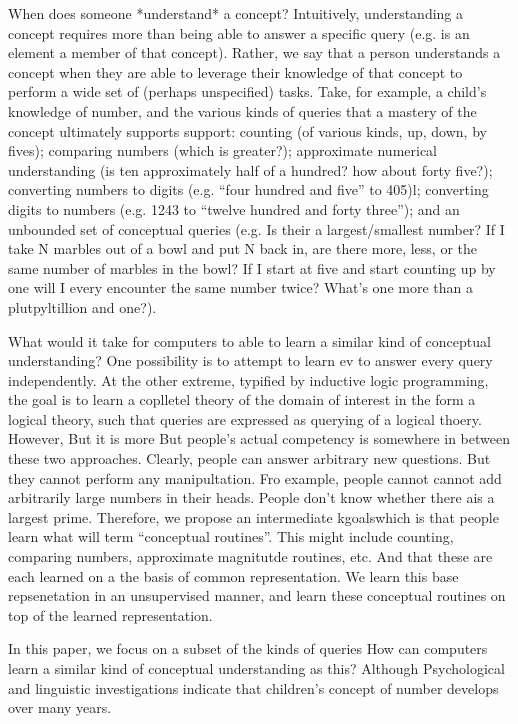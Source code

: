 \documentclass{article}
\begin{document}
When does someone *understand* a concept? Intuitively, understanding a
concept requires more than being able to answer a specific query
(e.g. is an element a member of that concept). Rather, we say that a
person understands a concept when they are able to leverage their
knowledge of that concept to perform a wide set of (perhaps
unspecified) tasks. Take, for example, a child's knowledge of number,
and the various kinds of queries that a mastery of the concept
ultimately supports support: counting (of various kinds, up, down, by
fives); comparing numbers (which is greater?); approximate numerical
understanding (is ten approximately half of a hundred? how about forty
five?); converting numbers to digits (e.g. ``four hundred and five''
to 405)l; converting digits to numbers (e.g. 1243 to ``twelve hundred
and forty three''); and an unbounded set of conceptual queries
(e.g. Is their a largest/smallest number? If I take N marbles out of a
bowl and put N back in, are there more, less, or the same number of
marbles in the bowl? If I start at five and start counting up by one
will I every encounter the same number twice? What's one more than a
plutpyltillion and one?).

What would it take for computers to able to learn a similar kind of
conceptual understanding? One possibility is to attempt to learn ev to
answer every query independently. At the other extreme, typified by
inductive logic programming, the goal is to learn a coplletel theory
of the domain of interest in the form a logical theory, such that
queries are expressed as querying of a logical thoery. However, But it
is more But people's actual competency is somewhere in between these
two approaches.  Clearly, people can answer arbitrary new
questions. But they cannot perform any manipultation. Fro example,
people cannot cannot add arbitrarily large numbers in their
heads. People don't know whether there ais a largest prime.
Therefore, we propose an intermediate kgoalswhich is that people learn
what will term ``conceptual routines''. This might include counting,
comparing numbers, approximate magnitutde routines, etc. And that
these are each learned on a the basis of common representation. We
learn this base repsenetation in an unsupervised manner, and learn
these conceptual routines on top of the learned representation. 

In this paper, we focus on a subset of the kinds of queries How can
computers learn a similar kind of conceptual understanding as this?
Although Psychological and linguistic investigations indicate that
children's concept of number develops over many years.
\end{document}
